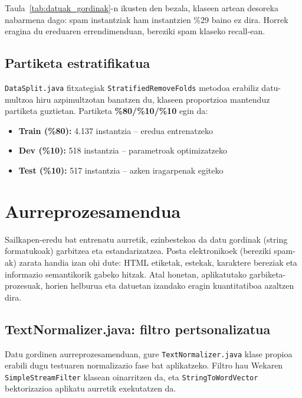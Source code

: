 \documentclass[12pt, a4paper]{article}
\begin{document}
Taula~\ref{tab:datuak_gordinak}-n ikusten den bezala, klaseen artean desoreka
nabarmena dago: spam instantziak ham instantzien \%29 baino ez dira.
Horrek eragina du ereduaren errendimenduan, bereziki spam klaseko recall-ean.

\subsection{Partiketa estratifikatua}

\texttt{DataSplit.java} fitxategiak \texttt{StratifiedRemoveFolds} metodoa erabiliz
datu-multzoa hiru azpimultzotan banatzen du, klaseen proportzioa mantenduz
partiketa guztietan. Partiketa \textbf{\%80/\%10/\%10} egin da:

\begin{itemize}
    \item \textbf{Train (\%80):} 4.137 instantzia -- eredua entrenatzeko
    \item \textbf{Dev (\%10):} 518 instantzia -- parametroak optimizatzeko
    \item \textbf{Test (\%10):} 517 instantzia -- azken iragarpenak egiteko
\end{itemize}

\newpage
\section{Aurreprozesamendua}

Sailkapen-eredu bat entrenatu aurretik, ezinbestekoa da datu gordinak (string formatukoak) garbitzea eta estandarizatzea. Posta elektronikoek (bereziki spam-ak) zarata handia izan ohi dute: HTML etiketak, estekak, karaktere bereziak eta informazio semantikorik gabeko hitzak. Atal honetan, aplikatutako garbiketa-prozesuak, horien helburua eta datuetan izandako eragin kuantitatiboa azaltzen dira.

\subsection{TextNormalizer.java: filtro pertsonalizatua}
Datu gordinen aurreprozesamenduan, gure \texttt{TextNormalizer.java} klase propioa erabili dugu testuaren normalizazio fase bat aplikatzeko. Filtro hau Wekaren \texttt{SimpleStreamFilter} klasean oinarritzen da, eta \texttt{StringToWordVector} bektorizazioa aplikatu aurretik exekutatzen da.
\end{document}
